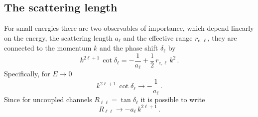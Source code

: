 \documentclass[10pt,a4paper]{article}
\begin{document}
		\subsection{The scattering length}
		For small energies there are two observables of importance, which depend linearly on the energy, the scattering length $a_\ell$ and the effective range $r_{e,\ell}$, they are connected to the momentum $k$ and the phase shift $\delta_\ell$ by 
		\begin{equation}
			k^{2\ell+1}\,\cot\delta_\ell = -\frac{1}{a_\ell} + \frac{1}{2}\,r_{e,\ell}\,k^2\,. 
		\end{equation}
		Specifically, for $E\rightarrow 0$ 
		\begin{equation}
			k^{2\ell+1}\,\cot\delta_\ell\rightarrow -\frac{1}{a_\ell}\,.
		\end{equation}
		Since for uncoupled channels $R_{\ell\ell}=\tan\delta_\ell$ it is possible to write
		\begin{equation}
			R_{\ell\ell} \rightarrow 
			-a_\ell\,k^{2\ell+1}\,.
		\end{equation}
		
\end{document}
